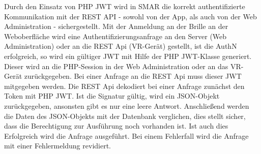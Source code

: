 Durch den Einsatz von PHP JWT wird in \ac{SMAR} die korrekt authentifizierte Kommunikation mit der REST API - sowohl von der App, als auch von der Web Administration - sichergestellt.
Mit der Anmeldung an der Brille \bzw an der Weboberfläche wird eine Authentifizierungsanfrage an den Server (Web Administration) oder an die REST Api (\acs{VR}-Gerät) gestellt, ist die \acl{AuthN} erfolgreich, so wird ein gültiger \ac{JWT} mit Hilfe der PHP JWT-Klasse generiert. Dieser wird an die PHP-Session in der Web Administration oder an das \acs{VR}-Gerät zurückgegeben. Bei einer Anfrage an die REST Api muss dieser \acs{JWT} mitgegeben werden. Die REST Api dekodiert bei einer Anfrage zunächst den Token mit PHP JWT. Ist die Signatur gültig, wird ein JSON-Objekt zurückgegeben, ansonsten gibt es nur eine leere Antwort. Anschließend werden die Daten des JSON-Objekts mit der Datenbank verglichen, dies stellt sicher, dass die Berechtigung zur Ausführung noch vorhanden ist. Ist auch dies Erfolgreich wird die Anfrage ausgeführt. Bei einem Fehlerfall wird die Anfrage mit einer Fehlermeldung revidiert.